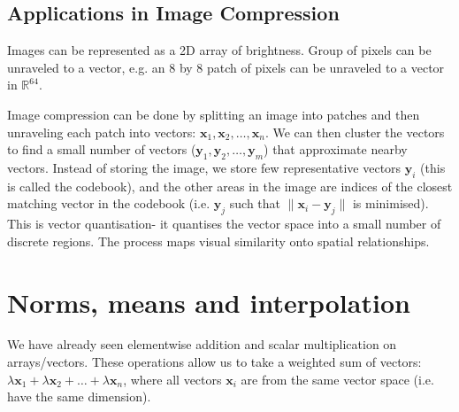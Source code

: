 \documentclass[a4paper, openany]{memoir}
\begin{document}
    \subsection{Applications in Image Compression}
    Images can be represented as a 2D array of brightness. Group of pixels can be unraveled to a vector, e.g. an 8 by 8 patch of pixels can be unraveled to a vector in $\mathbb{R}^{64}$.

    Image compression can be done by splitting an image into patches and then unraveling each patch into vectors: $\mathbf{x}_1, \mathbf{x}_2, \dots, \mathbf{x}_n$. We can then cluster the vectors to find a small number of vectors ($\mathbf{y}_1, \mathbf{y}_2, \dots, \mathbf{y}_m$) that approximate nearby vectors. Instead of storing the image, we store few representative vectors $\mathbf{y}_i$ (this is called the codebook), and the other areas in the image are indices of the closest matching vector in the codebook (i.e. $\mathbf{y}_j$ such that $\lVert \mathbf{x}_i - \mathbf{y}_j \rVert$ is minimised). This is vector quantisation- it quantises the vector space into a small number of discrete regions. The process maps visual similarity onto spatial relationships.
    \newpage

    \section{Norms, means and interpolation}
    We have already seen elementwise addition and scalar multiplication on arrays/vectors. These operations allow us to take a weighted sum of vectors: $\lambda \mathbf{x}_1 + \lambda \mathbf{x}_2 + \dots + \lambda \mathbf{x}_n$, where all vectors $\mathbf{x}_i$ are from the same vector space (i.e. have the same dimension).
\end{document}
